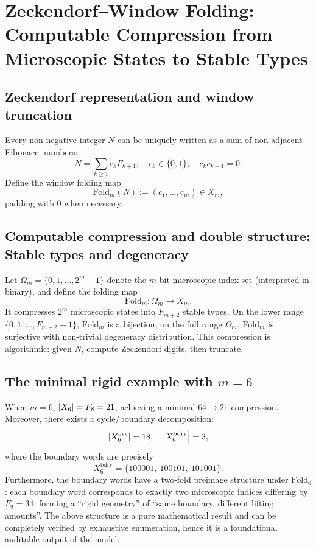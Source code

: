 \section{Zeckendorf--Window Folding: Computable Compression from Microscopic States to Stable Types}

\subsection{Zeckendorf representation and window truncation}

Every non-negative integer $N$ can be uniquely written as a sum of non-adjacent Fibonacci numbers:
\[
N=\sum_{k\ge 1}c_k F_{k+1},\quad c_k\in\{0,1\},\quad c_kc_{k+1}=0.
\]
Define the window folding map
\[
\mathrm{Fold}_m(N):=(c_1,\dots,c_m)\in X_m,
\]
padding with $0$ when necessary.

\subsection{Computable compression and double structure: Stable types and degeneracy}

Let $\Omega_m=\{0,1,\dots,2^m-1\}$ denote the $m$-bit microscopic index set (interpreted in binary), and define the folding map
\[
\mathrm{Fold}_m:\Omega_m\to X_m.
\]
It compresses $2^m$ microscopic states into $F_{m+2}$ stable types. On the lower range $\{0,1,\dots,F_{m+2}-1\}$, $\mathrm{Fold}_m$ is a bijection; on the full range $\Omega_m$, $\mathrm{Fold}_m$ is surjective with non-trivial degeneracy distribution.
This compression is algorithmic: given $N$, compute Zeckendorf digits, then truncate.

\subsection{The minimal rigid example with \texorpdfstring{$m=6$}{m=6}}

When $m=6$, $\left\lvert X_6\right\rvert=F_8=21$, achieving a minimal $64\to 21$ compression. Moreover, there exists a cycle/boundary decomposition:
\[
\left\lvert X_6^{\mathrm{cyc}}\right\rvert=18,\quad \left\lvert X_6^{\mathrm{bdry}}\right\rvert=3,
\]
where the boundary words are precisely
\[
X_6^{\mathrm{bdry}}=\{100001,\ 100101,\ 101001\}.
\]
Furthermore, the boundary words have a two-fold preimage structure under $\mathrm{Fold}_6$: each boundary word corresponds to exactly two microscopic indices differing by $F_9=34$, forming a ``rigid geometry'' of ``same boundary, different lifting amounts''.
The above structure is a pure mathematical result and can be completely verified by exhaustive enumeration, hence it is a foundational auditable output of the model.
